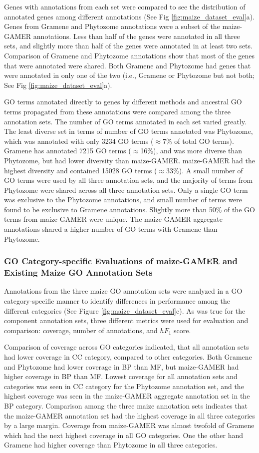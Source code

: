 Genes with annotations from each set were compared to see the distribution of annotated genes among different annotations (See Fig \ref{fig:maize_dataset_eval}a). Genes from Gramene and Phytozome annotations were a subset of the maize-GAMER annotations. Less than half of the genes were annotated in all three sets, and slightly more than half of the genes were annotated in at least two sets. Comparison of Gramene and Phytozome annotations show that most of the genes that were annotated were shared. Both Gramene and Phytozome had genes that were annotated in only one of the two (i.e., Gramene or Phytozome but not both; See Fig \ref{fig:maize_dataset_eval}a).

GO terms annotated directly to genes by different methods and ancestral GO terms propagated from these annotations were compared among the three annotation sets. The number of GO terms annotated in each set varied greatly. The least diverse set in terms of number of GO terms annotated was Phytozome, which was annotated with only \num{3234} GO terms ($\approx$7\% of total GO terms). Gramene has annotated \num{7215} GO terms ($\approx$16\%), and was more diverse than Phytozome, but had lower diversity than maize-GAMER. maize-GAMER had the highest diversity and contained \num{15028} GO terms ($\approx$33\%). A small number of GO terms were used by all three annotation sets, and the majority of terms from Phytozome were shared across all three annotation sets. Only a single GO term was exclusive to the Phytozome annotations, and small number of terms were found to be exclusive to Gramene annotations. Slightly more than 50\% of the GO terms from maize-GAMER were unique. The maize-GAMER aggregate annotations shared a higher number of GO terms with Gramene than Phytozome.

\subsubsection{GO Category-specific Evaluations of maize-GAMER and Existing Maize GO Annotation Sets}
Annotations from the three maize GO annotation sets were analyzed in a GO category-specific manner to identify differences in performance among the different categories (See Figure \ref{fig:maize_dataset_eval}c). As was true for the component annotation sets, three different metrics were used for evaluation and comparison: coverage, number of annotations, and $hF_1$ score.

Comparison of coverage across GO categories indicated, that all annotation sets had lower coverage in CC category, compared to other categories. Both Gramene and Phytozome had lower coverage in BP than MF, but maize-GAMER had higher coverage in BP than MF. Lowest coverage for all annotation sets and categories was seen in CC category for the Phytozome annotation set, and the highest coverage was seen in the maize-GAMER aggregate annotation set in the BP category. Comparison among the three maize annotation sets indicates that the maize-GAMER annotation set had the highest coverage in all three categories by a large margin. Coverage from maize-GAMER was almost twofold of Gramene which had the next highest coverage in all GO categories. One the other hand Gramene had higher coverage than Phytozome in all three categories.


